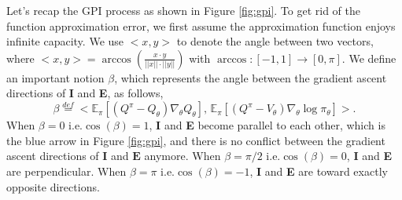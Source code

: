 \begin{figure}[t]
\begin{minipage}[t]{0.58\linewidth}
{%
 }
\label{fig:gpi2}
\end{minipage}
\vskip -0.1in
\end{figure}

Let's recap the GPI process as shown in Figure \ref{fig:gpi}.
To get rid of the function approximation error, we first assume the approximation function enjoys infinite capacity. 
We use $<x, y>$ to denote the angle between two vectors, where $<x, y> = \arccos (\frac{x\cdot y}{||x||\cdot||y||})$ { with $\arccos: [-1, 1] \rightarrow [0, \pi]$}. 
We define an important notion $\beta$, which represents the angle between the gradient ascent directions of \textbf{I} and \textbf{E}, as follows,
{ 
\begin{equation}
    \beta \overset{def}{=} <\mathbb{E}_\pi[(Q^\pi-Q_\theta)\nabla_\theta Q_\theta],\, \mathbb{E}_\pi[(Q^\pi-V_\theta) \nabla_\theta \log \pi_\theta]>.
\end{equation}
}
{ When $\beta = 0$ i.e.$\cos(\beta) = 1$, \textbf{I} and \textbf{E} become parallel to each other,  which is the blue arrow in Figure \ref{fig:gpi},
and there is no conflict between the gradient ascent directions of $\textbf{I}$ and $\textbf{E}$ anymore.
When $\beta = \pi / 2$ i.e.$\cos(\beta) = 0$, \textbf{I} and \textbf{E} are perpendicular. 
When $\beta = \pi$ i.e.$\cos(\beta) = -1$, \textbf{I} and \textbf{E} are toward exactly opposite directions. }


